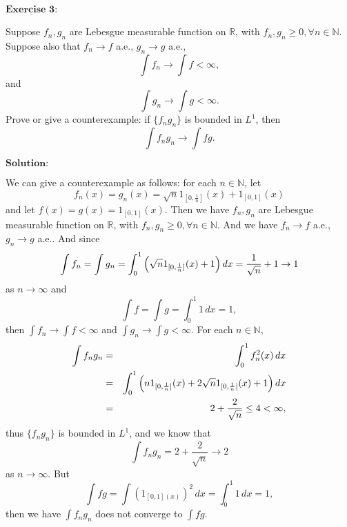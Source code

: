 \documentclass[12pt,a4paper]{ctexart}
\begin{document}
\newpage 

$\underline{\textbf{Exercise 3:}}$

Suppose $f_n, g_n$ are Lebesgue measurable function on $\mathbb R$, with $f_n, g_n \geq 0, \forall n \in \mathbb N$. Suppose also that $f_n \to f$ a.e., $g_n \to g$ a.e.,
$$\int f_n \to \int f < \infty,$$
and
$$\int g_n \to \int g < \infty.$$
Prove or give a counterexample: if $\{f_n g_n\}$ is bounded in $L^1$, then
$$\int f_n g_n \to \int f g.$$

\vspace{8pt}
$\textbf{Solution:}$

We can give a counterexample as follows: for each $n \in \mathbb N$, let
$$f_n (x) = g_n (x) = \sqrt{n} 1_{[0, \frac{1}{n}]}(x) + 1_{[0,1]}(x)$$
and let $f(x) = g(x) = 1_{[0,1]}(x)$. Then we have $f_n, g_n$ are Lebesgue measurable function on $\mathbb R$, with $f_n, g_n \geq 0, \forall n \in \mathbb N$. And we have $f_n \to f$ a.e., $g_n \to g$ a.e.. And since
$$\int f_n = \int g_n = \int_{0}^{1} \Big{(} \sqrt{n} 1_{[0, \frac{1}{n}]}(x) + 1 \Big{)} \, d x = \frac{1}{\sqrt{n}} + 1 \to 1$$
as $n \to \infty$ and 
$$\int f = \int g = \int_{0}^{1} 1 \, d x = 1,$$
then $\int f_n \to \int f < \infty$ and $\int g_n \to \int g < \infty$. For each $n \in \mathbb N$,
\begin{eqnarray*}
    \int f_n g_n  & = & \int_{0}^{1} f_n^2(x) \, d x \\
    & = & \int_{0}^{1} \Big{(} n 1_{[0,\frac{1}{n}]}(x) + 2 \sqrt{n} 1_{[0, \frac{1}{n}]}(x) + 1 \Big{)} \, d x \\
    & = & 2 + \frac{2}{\sqrt{n}} \leq 4 < \infty,
\end{eqnarray*}
thus $\{f_n g_n\}$ is bounded in $L^1$, and we know that
\begin{equation*}
    \int f_n g_n = 2 + \frac{2}{\sqrt{n}} \to 2
\end{equation*}
as $n \to \infty$. But
$$\int f g = \int (1_{[0,1] (x)})^2 \, d x = \int_{0}^{1} 1 \, d x = 1,$$
then we have $\int f_n g_n$ does not converge to $\int f g$.
\end{document}
